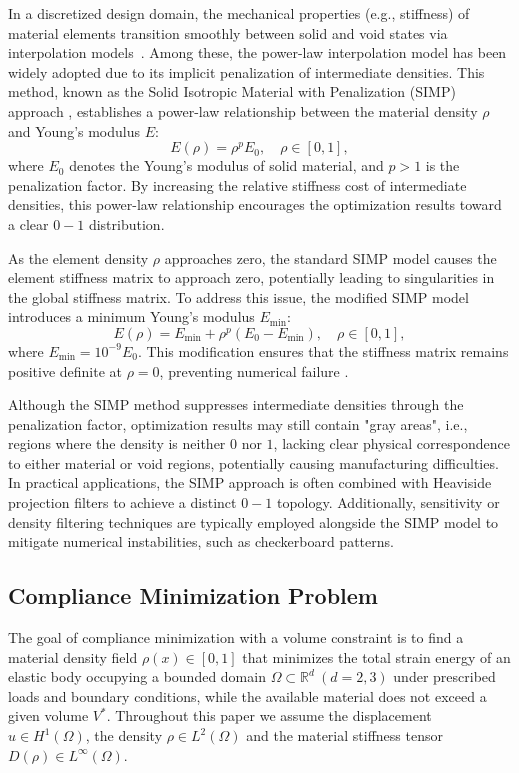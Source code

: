 \documentclass[mathpazo]{cicp}
\begin{document}
In a discretized design domain, the mechanical properties (e.g., stiffness) of material elements transition smoothly between solid and void states via interpolation models~\cite{bendsoe1989optimal}. Among these, the power-law interpolation model has been widely adopted due to its implicit penalization of intermediate densities. This method, known as the Solid Isotropic Material with Penalization (SIMP) approach \cite{zhou1991coc}, establishes a power-law relationship between the material density $\rho$ and Young's modulus $E$:
\begin{equation*}
	E(\rho) = \rho^p E_0,\quad \rho \in [0,1],
\end{equation*}
where $E_0$ denotes the Young's modulus of solid material, and $p>1$ is the penalization factor. By increasing the relative stiffness cost of intermediate densities, this power-law relationship encourages the optimization results toward a clear $0-1$ distribution.

As the element density $\rho$ approaches zero, the standard SIMP model causes the element stiffness matrix to approach zero, potentially leading to singularities in the global stiffness matrix. To address this issue, the modified SIMP model introduces a minimum Young's modulus $E_{\min}$:
\begin{equation*}
	E(\rho) = E_{\min} + \rho^p(E_0 - E_{\min}),\quad \rho \in [0,1],
\end{equation*}
where $E_{\min} = 10^{-9} E_0$. This modification ensures that the stiffness matrix remains positive definite at $\rho = 0$, preventing numerical failure \cite{sigmund2007morphology}.

Although the SIMP method suppresses intermediate densities through the penalization factor, optimization results may still contain "gray areas", i.e., regions where the density is neither $0$ nor $1$, lacking clear physical correspondence to either material or void regions, potentially causing manufacturing difficulties. In practical applications, the SIMP approach is often combined with Heaviside projection filters to achieve a distinct $0-1$ topology. Additionally, sensitivity or density filtering techniques are typically employed alongside the SIMP model to mitigate numerical instabilities, such as checkerboard patterns.

\subsection{Compliance Minimization Problem}
The goal of compliance minimization with a volume constraint is to find a material density field $\rho(x)\in[0,1]$ that minimizes the total strain energy of an elastic body occupying a bounded domain $\Omega\subset\mathbb{R}^d~(d=2,3)$ under prescribed loads and boundary conditions, while the available material does not exceed a given volume $V^*$. Throughout this paper we assume the displacement $u\in{H}^1(\Omega)$, the density $\rho\in{L}^2(\Omega)$ and the material stiffness tensor $D(\rho)\in{L}^{\infty}(\Omega)$.
\end{document}
